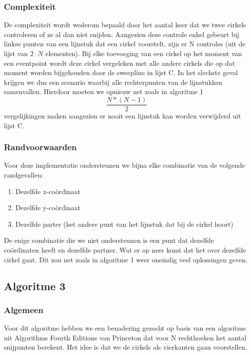 \documentclass[11pt,a4paper]{article}
\begin{document}
\subsubsection{Complexiteit}
De complexiteit wordt wederom bepaald door het aantal keer dat we twee cirkels controleren of ze al dan niet snijden. Aangezien deze controle enkel gebeurt bij linkse punten van een lijnstuk dat een cirkel voorstelt, zijn er N controles (uit de lijst van $2\cdot N$ elementen). Bij elke toevoeging van een cirkel op het moment van een eventpoint wordt deze cirkel vergeleken met alle andere cirkels die op dat moment worden bijgehouden door de sweepline in lijst C. In het slechste geval krijgen we dus een scenario waarbij alle rechterpunten van de lijnstukken samenvallen. Hierdoor moeten we opnieuw net zoals in algoritme 1 $$\frac{N*(N-1)}{2}$$ vergelijkingen maken aangezien er nooit een lijnstuk kan worden verwijderd uit lijst C.
\subsubsection{Randvoorwaarden}
Voor deze implementatie ondersteunen we bijna elke combinatie van de volgende randgevallen:
\begin{enumerate}
\item Dezelfde x-co\"ordinaat
\item Dezelfde y-co\"ordinaat
\item Dezelfde parter (het andere punt van het lijnstuk dat bij de cirkel hoort)
\end{enumerate}
De enige combinatie die we niet ondersteunen is een punt dat dezelfde co\"ordinaten heeft en dezelfde partner. Wat er op neer komt dat het over dezelfde cirkel gaat. Dit zou net zoals in algoritme 1 weer oneindig veel oplossingen geven.
\subsection{Algoritme 3}
\subsubsection{Algemeen}

Voor dit algoritme hebben we een benadering gezocht op basis van een algoritme uit Algorithms Fourth Editions van Princeton dat voor N rechthoeken het aantal snijpunten berekent. Het idee is dat we de cirkels als vierkanten gaan voorstellen.
\end{document}
